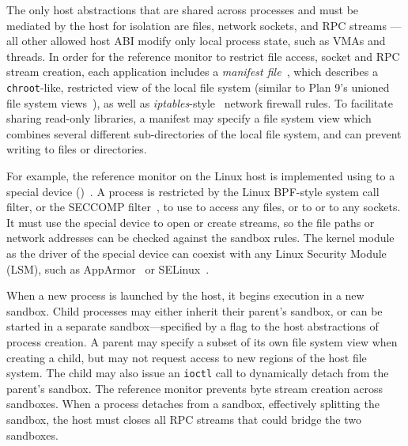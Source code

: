 The only host abstractions that are shared across processes and must be mediated by the host for isolation are files, network sockets, and RPC streams
--- all other allowed host ABI modify only local process state, such as VMAs and threads.
In order for the reference monitor to restrict file access, socket and RPC stream creation,
each application includes a {\em manifest file}~\cite{hunt07rethink},
which describes a {\tt chroot}-like, restricted view of the local 
file system (similar to Plan 9's unioned file system views~\cite{pike90plan9}),
as well as {\em iptables}-style~\cite{iptablesman} network firewall rules.
To facilitate sharing read-only libraries, a manifest may specify a file system view which combines several different sub-directories of the local file system, and can prevent writing to files or directories.


For example, the \graphene{} reference monitor on the Linux host is implemented using  to a special device ()~.
A process is restricted by the Linux BPF-style system call filter, or the SECCOMP filter~\cite{seccomp}, to use  to access any files, or to  or  to any sockets.
It must use the \graphene{} special device to open or create streams, so the file paths or network addresses can be checked against the sandbox rules. The kernel module as the driver of the \graphene{} special device can coexist with any Linux Security Module (LSM), such as AppArmor~\cite{apparmor} or SELinux~\cite{selinux}.


When a new process is launched by the host, it begins execution in a new sandbox.  
Child processes may either inherit their parent's sandbox, or can be started in a separate sandbox---specified by a flag to the host abstractions of process creation.
A parent may specify a subset of its own file system view 
when creating a child, but may not request access to new regions of the host file system. 
The child may also issue an {\tt ioctl} call to 
dynamically detach from the parent's sandbox. The reference monitor prevents byte stream creation across sandboxes.
When a process detaches from a sandbox, effectively splitting the sandbox, the host must closes all RPC streams that could bridge the two sandboxes.

